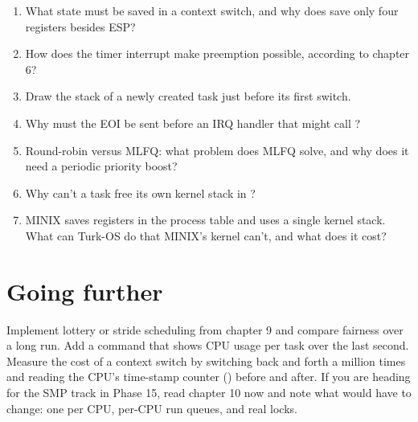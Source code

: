 \documentclass[11pt,a4paper]{article}
\begin{document}
\begin{questionbox}
\begin{enumerate}
  \item What state must be saved in a context switch, and why does  save only four registers besides ESP?
  \item How does the timer interrupt make preemption possible, according to \OSTEP chapter 6?
  \item Draw the stack of a newly created task just before its first switch.
  \item Why must the EOI be sent before an IRQ handler that might call ?
  \item Round-robin versus MLFQ: what problem does MLFQ solve, and why does it need a periodic priority boost?
  \item Why can't a task free its own kernel stack in ?
  \item MINIX saves registers in the process table and uses a single kernel stack. What can Turk-OS do that MINIX's kernel can't, and what does it cost?
\end{enumerate}
\end{questionbox}

\section{Going further}

Implement lottery or stride scheduling from \OSTEP chapter 9 and compare fairness over a long run. Add a 
command that shows CPU usage per task over the last second. Measure the cost of a context switch by switching back and
forth a million times and reading the CPU's time-stamp counter () before and after. If you are heading for
the SMP track in Phase 15, read \OSTEP chapter 10 now and note what would have to change: one  per CPU,
per-CPU run queues, and real locks.

\booklegend
\end{document}
